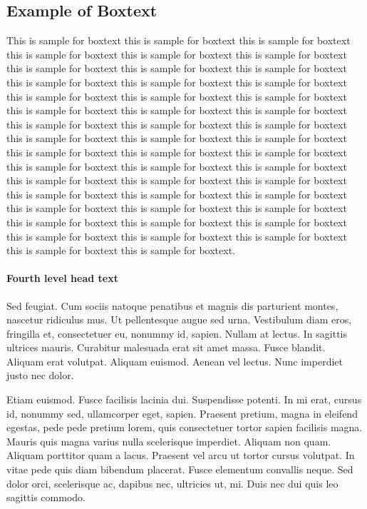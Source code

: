 \documentclass[APA,STIX1COL]{WileyNJD-v2}
\begin{document}
\begin{boxtext}
\section*{Example of Boxtext}%
This is sample for boxtext this is sample for boxtext this is sample for boxtext this is sample for boxtext this is sample for boxtext this is sample for boxtext this is sample for boxtext this is sample for boxtext this is sample for boxtext this is sample for boxtext this is sample for boxtext this is sample for boxtext this is sample for boxtext this is sample for boxtext this is sample for boxtext this is sample for boxtext this is sample for boxtext this is sample for boxtext this is sample for boxtext this is sample for boxtext this is sample for boxtext this is sample for boxtext this is sample for boxtext this is sample for boxtext this is sample for boxtext this is sample for boxtext this is sample for boxtext this is sample for boxtext this is sample for boxtext this is sample for boxtext this is sample for boxtext this is sample for boxtext this is sample for boxtext this is sample for boxtext this is sample for boxtext this is sample for boxtext this is sample for boxtext this is sample for boxtext this is sample for boxtext this is sample for boxtext this is sample for boxtext this is sample for boxtext this is sample for boxtext this is sample for boxtext this is sample for boxtext this is sample for boxtext this is sample for boxtext.
\end{boxtext}


\paragraph{Fourth level head text}

Sed feugiat. Cum sociis natoque penatibus et magnis dis parturient montes, nascetur ridiculus mus. Ut pellentesque
augue sed urna. Vestibulum diam eros, fringilla et, consectetuer eu, nonummy id, sapien. Nullam at lectus. In sagittis
ultrices mauris. Curabitur malesuada erat sit amet massa. Fusce blandit. Aliquam erat volutpat. Aliquam euismod.
Aenean vel lectus. Nunc imperdiet justo nec dolor.

Etiam euismod. Fusce facilisis lacinia dui. Suspendisse potenti. In mi erat, cursus id, nonummy sed, ullamcorper
eget, sapien. Praesent pretium, magna in eleifend egestas, pede pede pretium lorem, quis consectetuer tortor sapien
facilisis magna. Mauris quis magna varius nulla scelerisque imperdiet. Aliquam non quam. Aliquam porttitor quam
a lacus. Praesent vel arcu ut tortor cursus volutpat. In vitae pede quis diam bibendum placerat. Fusce elementum
convallis neque. Sed dolor orci, scelerisque ac, dapibus nec, ultricies ut, mi. Duis nec dui quis leo sagittis commodo.
\end{document}
